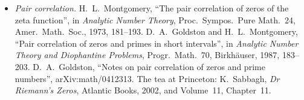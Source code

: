 \begin{itemize}
\item \emph{Pair correlation.} H.~L.~Montgomery, ``The pair correlation of zeros of the zeta function'', in \emph{Analytic Number Theory}, Proc.\ Sympos.\ Pure Math.\ 24, Amer.\ Math.\ Soc., 1973, 181--193. D.~A.~Goldston and H.~L.~Montgomery, ``Pair correlation of zeros and primes in short intervals'', in \emph{Analytic Number Theory and Diophantine Problems}, Progr.\ Math.\ 70, Birkhäuser, 1987, 183--203. D.~A.~Goldston, ``Notes on pair correlation of zeros and prime numbers'', arXiv:math/0412313. The tea at Princeton: K.~Sabbagh, \emph{Dr Riemann's Zeros}, Atlantic Books, 2002, and Volume~11, Chapter~11.
\end{itemize}
